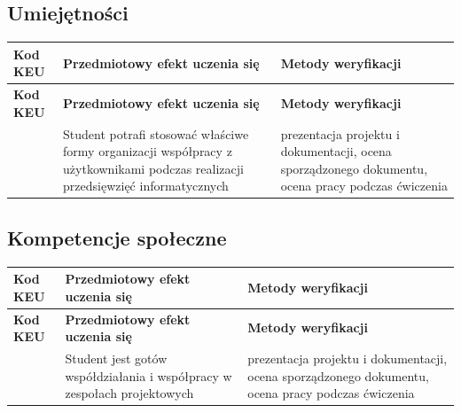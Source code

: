 \documentclass[12pt, a4paper]{article}
\newcommand{\thdrule}{\noalign{\global\setlength{\extrarowheight}{0pt}}}
\newcommand{\thdend}{\noalign{\global\setlength{\extrarowheight}{3pt}}}
\begin{document}
\subsection*{Umiejętności}
{\scriptsize
\begin{longtable}{m{1.6cm}m{9.0cm}m{4.2cm}}
\thdrule\toprule
\rowcolor{pjatkRed} {\color{white}\footnotesize\textbf{\vphantom{Ag}Kod KEU}} & {\color{white}\footnotesize\textbf{\vphantom{Ag}Przedmiotowy efekt uczenia się}} & {\color{white}\footnotesize\textbf{\vphantom{Ag}Metody weryfikacji}} \\
\midrule\thdend
\endfirsthead
\thdrule\toprule
\rowcolor{pjatkRed} {\color{white}\footnotesize\textbf{\vphantom{Ag}Kod KEU}} & {\color{white}\footnotesize\textbf{\vphantom{Ag}Przedmiotowy efekt uczenia się}} & {\color{white}\footnotesize\textbf{\vphantom{Ag}Metody weryfikacji}} \\
\midrule\thdend
\endhead
  \rowcolor{tableRowLight}  & Student potrafi stosować właściwe formy organizacji współpracy z użytkownikami podczas realizacji przedsięwzięć informatycznych & prezentacja projektu i dokumentacji, ocena sporządzonego dokumentu, ocena pracy podczas ćwiczenia \\
\bottomrule
\end{longtable}}

\subsection*{Kompetencje społeczne}
{\scriptsize
\begin{longtable}{m{1.6cm}m{9.0cm}m{4.2cm}}
\thdrule\toprule
\rowcolor{pjatkRed} {\color{white}\footnotesize\textbf{\vphantom{Ag}Kod KEU}} & {\color{white}\footnotesize\textbf{\vphantom{Ag}Przedmiotowy efekt uczenia się}} & {\color{white}\footnotesize\textbf{\vphantom{Ag}Metody weryfikacji}} \\
\midrule\thdend
\endfirsthead
\thdrule\toprule
\rowcolor{pjatkRed} {\color{white}\footnotesize\textbf{\vphantom{Ag}Kod KEU}} & {\color{white}\footnotesize\textbf{\vphantom{Ag}Przedmiotowy efekt uczenia się}} & {\color{white}\footnotesize\textbf{\vphantom{Ag}Metody weryfikacji}} \\
\midrule\thdend
\endhead
  \rowcolor{tableRowLight}  & Student jest gotów współdziałania i współpracy w zespołach projektowych & prezentacja projektu i dokumentacji, ocena sporządzonego dokumentu, ocena pracy podczas ćwiczenia \\
\bottomrule
\end{longtable}}
\end{document}
